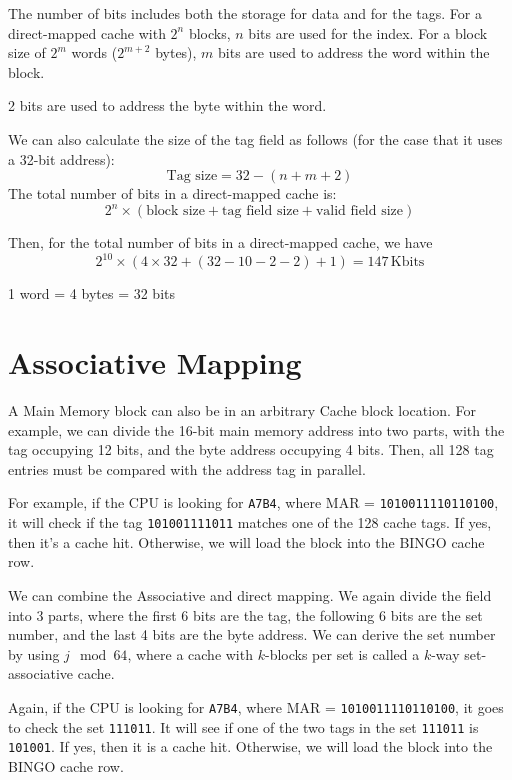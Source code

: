The number of bits includes both the storage for data and for the tags. For a direct-mapped cache with \(2^n\) blocks, \(n\) bits are used for the index. For a block size of \(2^m\) words (\(2^{m+2}\) bytes), \(m\) bits are used to address the word within the block.

2 bits are used to address the byte within the word.

We can also calculate the size of the tag field as follows (for the case that it uses a 32-bit address):
\[
  \text{Tag size} = 32 - (n + m + 2)
\]
The total number of bits in a direct-mapped cache is:
\[
  2^n \times (\text{block size} + \text{tag field size} + \text{valid field size})
\]

Then, for the total number of bits in a direct-mapped cache, we have
\[
  2^{10} \times (4 \times 32 + (32 - 10 - 2 - 2) + 1) = 147\,\text{Kbits}
\]

\begin{remark}
  1 word = 4 bytes = 32 bits
\end{remark}

\section{Associative Mapping}
A Main Memory block can also be in an arbitrary Cache block location. For example, we can divide the 16-bit main memory address into two parts, with the tag occupying 12 bits, and the byte address occupying 4 bits. Then, all 128 tag entries must be compared with the address tag in parallel.

For example, if the CPU is looking for \verb|A7B4|, where MAR = \verb|1010011110110100|, it will check if the tag \verb|101001111011| matches one of the 128 cache tags. If yes, then it's a cache hit. Otherwise, we will load the block into the BINGO cache row.

We can combine the Associative and direct mapping. We again divide the field into 3 parts, where the first 6 bits are the tag, the following 6 bits are the set number, and the last 4 bits are the byte address. We can derive the set number by using \(j \mod 64\), where a cache with \(k\)-blocks per set is called a \(k\)-way set-associative cache.

Again, if the CPU is looking for \verb|A7B4|, where MAR = \verb|1010011110110100|, it goes to check the set \verb|111011|. It will see if one of the two tags in the set \verb|111011| is \verb|101001|. If yes, then it is a cache hit. Otherwise, we will load the block into the BINGO cache row.

